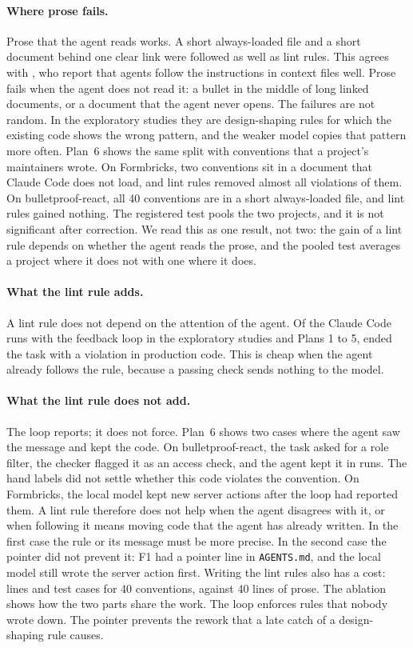 \documentclass[pdflatex,sn-mathphys-num]{sn-jnl}
\newcommand{\file}[1]{\texttt{#1}}
\begin{document}
\paragraph{Where prose fails.}
Prose that the agent reads works.
A short always-loaded file and a short document behind one clear link were followed as well as lint rules.
This agrees with \citet{gloaguen2026agentsmd}, who report that agents follow the instructions in context files well.
Prose fails when the agent does not read it: a bullet in the middle of long linked documents, or a document that the agent never opens.
The failures are not random.
In the exploratory studies they are design-shaping rules for which the existing code shows the wrong pattern, and the weaker model copies that pattern more often.
Plan~6 shows the same split with conventions that a project's maintainers wrote.
On Formbricks, two conventions sit in a document that Claude Code does not load, and lint rules removed almost all violations of them.
On bulletproof-react, all 40 conventions are in a short always-loaded file, and lint rules gained nothing.
The registered test pools the two projects, and it is not significant after correction.
We read this as one result, not two: the gain of a lint rule depends on whether the agent reads the prose, and the pooled test averages a project where it does not with one where it does.

\paragraph{What the lint rule adds.}
A lint rule does not depend on the attention of the agent.
Of the \NLoopRuns{} Claude Code runs with the feedback loop in the exploratory studies and Plans 1 to 5, \NLoopBroken{} ended the task with a violation in production code.
This is cheap when the agent already follows the rule, because a passing check sends nothing to the model.

\paragraph{What the lint rule does not add.}
The loop reports; it does not force.
Plan~6 shows two cases where the agent saw the message and kept the code.
On bulletproof-react, the task asked for a role filter, the checker flagged it as an access check, and the agent kept it in \PSixBPIgnoredRuns{} runs.
The hand labels did not settle whether this code violates the convention.
On Formbricks, the local model kept new server actions after the loop had reported them.
A lint rule therefore does not help when the agent disagrees with it, or when following it means moving code that the agent has already written.
In the first case the rule or its message must be more precise.
In the second case the pointer did not prevent it: F1 had a pointer line in \file{AGENTS.md}, and the local model still wrote the server action first.
Writing the lint rules also has a cost: \PSixBPLOC{} lines and \PSixBPCases{} test cases for 40 conventions, against 40 lines of prose.
The ablation shows how the two parts share the work.
The loop enforces rules that nobody wrote down.
The pointer prevents the rework that a late catch of a design-shaping rule causes.
\end{document}
